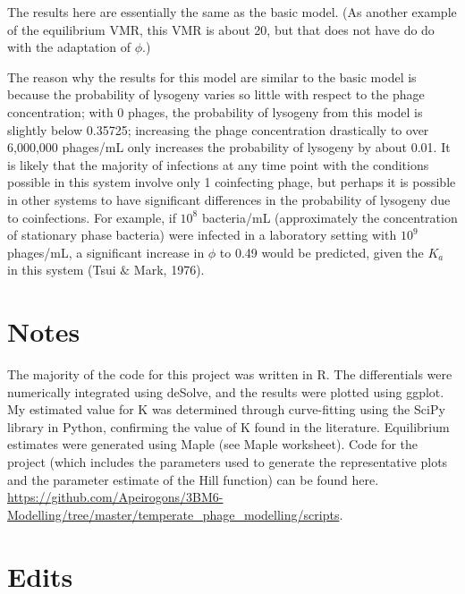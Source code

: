 \documentclass{article}
\begin{document}
The results here are essentially the same as the basic model. (As another example of the equilibrium VMR, this VMR is about 20, but that does not have do do with the adaptation of $\phi$.)

The reason why the results for this model are similar to the basic model is because the probability of lysogeny varies so little with respect to the phage concentration; with 0 phages, the probability of lysogeny from this model is slightly below 0.35725; increasing the phage concentration drastically to over 6,000,000 phages/mL only increases the probability of lysogeny by about 0.01. It is likely that the majority of infections at any time point with the conditions possible in this system involve only 1 coinfecting phage, but perhaps it is possible in other systems to have significant differences in the probability of lysogeny due to coinfections. For example, if $10^8$ bacteria/mL (approximately the concentration of stationary phase bacteria) were infected in a laboratory setting with $10^9$ phages/mL, a significant increase in $\phi$ to 0.49 would be predicted, given the $K_a$ in this system (Tsui $\&$ Mark, 1976). 

\section{Notes}
The majority of the code for this project was written in R. The differentials were numerically integrated using deSolve, and the results were plotted using ggplot. My estimated value for K was determined through curve-fitting using the SciPy library in Python, confirming the value of K found in the literature. Equilibrium estimates were generated using Maple (see Maple worksheet). Code for the project (which includes the parameters used to generate the representative plots and the parameter estimate of the Hill function) can be found here. \url{https://github.com/Apeirogons/3BM6-Modelling/tree/master/temperate_phage_modelling/scripts}. 

\section{Edits}
\end{document}
